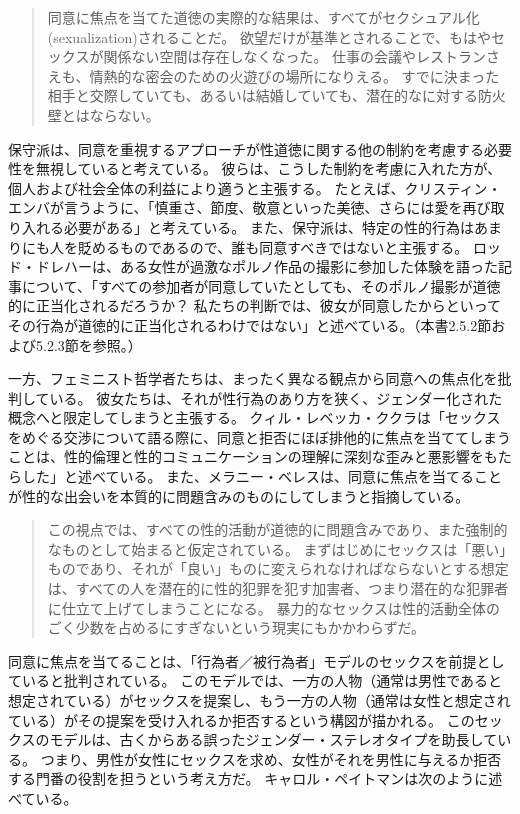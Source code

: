 \documentclass[paper=a4,book,openany]{jlreq}
\newcommand{\ig}[1]{}           %
\begin{document}
\begin{quote}
同意に焦点を当てた道徳の実際的な結果は、すべてがセクシュアル化(sexualization)されることだ。
欲望だけが基準とされることで、もはやセックスが関係ない空間は存在しなくなった。
仕事の会議やレストランさえも、情熱的な密会のための火遊びの場所になりえる。
すでに決まった相手と交際していても、あるいは結婚していても、潜在的なに対する防火壁とはならない。
\citep{french17:_its_past_time}
\end{quote}

保守派は、同意を重視するアプローチが性道徳に関する他の制約を考慮する必要性を無視していると考えている。
彼らは、こうした制約を考慮に入れた方が、個人および社会全体の利益により適うと主張する。
たとえば、クリスティン・エンバが言うように、「慎重さ、節度、敬意といった美徳、さらには愛を再び取り入れる必要がある」と考えている\citep{emba17:_lets_rethin_sex}。
また、保守派は、特定の性的行為はあまりにも人を貶めるものであるので、誰も同意すべきではないと主張する。
ロッド・ドレハー\ig{Rod Dreher}は、ある女性が過激なポルノ作品の撮影に参加した体験を語った記事について、「すべての参加者が同意していたとしても、そのポルノ撮影が道徳的に正当化されるだろうか？ 私たちの判断では、彼女が同意したからといってその行為が道徳的に正当化されるわけではない」と述べている\citep{dreher13:_porn_cultur_consen}。（本書2.5.2節および5.2.3節を参照。）

一方、フェミニスト哲学者たちは、まったく異なる観点から同意への焦点化を批判している。
彼女たちは、それが性行為のあり方を狭く、ジェンダー化された概念へと限定してしまうと主張する。
クィル・レベッカ・ククラは「セックスをめぐる交渉について語る際に、同意と拒否にほぼ排他的に焦点を当ててしまうことは、性的倫理と性的コミュニケーションの理解に深刻な歪みと悪影響をもたらした」と述べている\citep[p.75]{kukla18:_thats_what_she_said}。
また、メラニー・ベレスは、同意に焦点を当てることが性的な出会いを本質的に問題含みのものにしてしまうと指摘している。

\begin{quote}
この視点では、すべての性的活動が道徳的に問題含みであり、また強制的なものとして始まると仮定されている。
まずはじめにセックスは「悪い」ものであり、それが「良い」ものに変えられなければならないとする想定は、すべての人を潜在的に性的犯罪を犯す加害者、つまり潜在的な犯罪者に仕立て上げてしまうことになる。
暴力的なセックスは性的活動全体のごく少数を占めるにすぎないという現実にもかかわらずだ。
\citep[p.102]{beres07:_spont_sexual_consen}
\end{quote}

同意に焦点を当てることは、「行為者／被行為者」モデルのセックスを前提としていると批判されている。
このモデルでは、一方の人物（通常は男性であると想定されている）がセックスを提案し、もう一方の人物（通常は女性と想定されている）がその提案を受け入れるか拒否するという構図が描かれる。
このセックスのモデルは、古くからある誤ったジェンダー・ステレオタイプを助長している。
つまり、男性が女性にセックスを求め、女性がそれを男性に与えるか拒否する門番の役割を担うという考え方だ。
キャロル・ペイトマンは次のように述べている。
\end{document}
